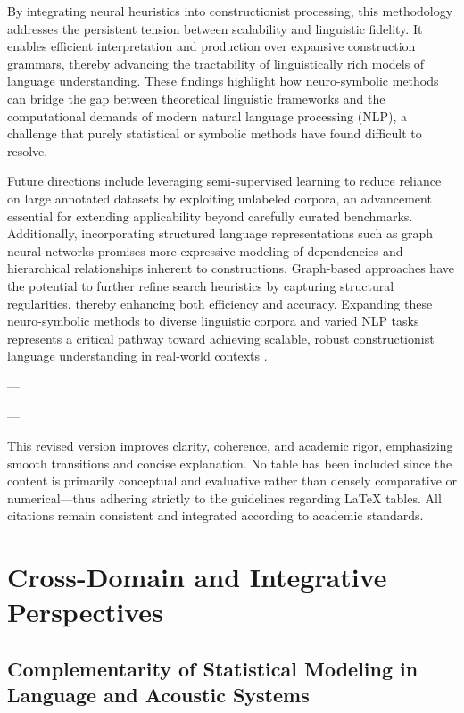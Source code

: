 \documentclass[11pt]{article}
\begin{document}
By integrating neural heuristics into constructionist processing, this methodology addresses the persistent tension between scalability and linguistic fidelity. It enables efficient interpretation and production over expansive construction grammars, thereby advancing the tractability of linguistically rich models of language understanding. These findings highlight how neuro-symbolic methods can bridge the gap between theoretical linguistic frameworks and the computational demands of modern natural language processing (NLP), a challenge that purely statistical or symbolic methods have found difficult to resolve.

Future directions include leveraging semi-supervised learning to reduce reliance on large annotated datasets by exploiting unlabeled corpora, an advancement essential for extending applicability beyond carefully curated benchmarks. Additionally, incorporating structured language representations such as graph neural networks promises more expressive modeling of dependencies and hierarchical relationships inherent to constructions. Graph-based approaches have the potential to further refine search heuristics by capturing structural regularities, thereby enhancing both efficiency and accuracy. Expanding these neuro-symbolic methods to diverse linguistic corpora and varied NLP tasks represents a critical pathway toward achieving scalable, robust constructionist language understanding in real-world contexts \cite{ref40}.

---

  
 

---

This revised version improves clarity, coherence, and academic rigor, emphasizing smooth transitions and concise explanation. No table has been included since the content is primarily conceptual and evaluative rather than densely comparative or numerical—thus adhering strictly to the guidelines regarding LaTeX tables. All citations remain consistent and integrated according to academic standards.

\section{Cross-Domain and Integrative Perspectives}

\subsection{Complementarity of Statistical Modeling in Language and Acoustic Systems}
\end{document}
